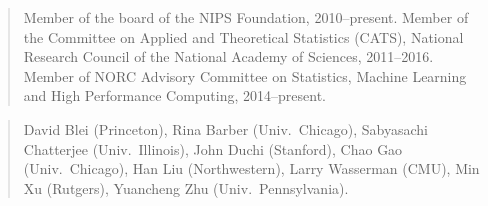 \documentclass[pdftex,12pt]{article}
\begin{document}
\begingroup
\addtolength{\leftmargini}{-.1in}
\begin{quote}
Member of the board of the NIPS Foundation, 2010--present.
Member of the Committee on Applied and Theoretical
Statistics (CATS), National Research Council of the National Academy
of Sciences, 2011--2016.
Member of NORC Advisory Committee on Statistics, Machine Learning and
High Performance Computing, 2014--present.
\end{quote}
\endgroup


\begingroup
\addtolength{\leftmargini}{-.1in}
\begin{quote}
David Blei (Princeton),  Rina Barber (Univ.~Chicago), Sabyasachi
Chatterjee (Univ.~Illinois), John Duchi (Stanford), Chao Gao
(Univ.~Chicago), Han Liu (Northwestern),
Larry Wasserman (CMU), Min Xu (Rutgers), Yuancheng Zhu (Univ.~Pennsylvania).
\end{quote}
\endgroup
\end{document}
